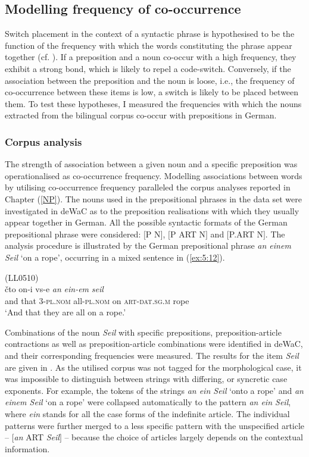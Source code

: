 \subsection{Modelling frequency of co-occurrence}

Switch placement in the context of a syntactic phrase is hypothesised to be the function of the frequency with which the words constituting the phrase appear together (cf. \citealt[33]{bybee-book-2010}). If a preposition and a noun co-occur with a high frequency, they exhibit a strong bond, which is likely to repel a code-switch. Conversely, if the association between the preposition and the noun is loose, i.e., the frequency of co-occurrence between these items is low, a switch is likely to be placed between them. To test these hypotheses, I measured the frequencies with which the nouns extracted from the bilingual corpus co-occur with prepositions in German.

\subsubsection{Corpus analysis}

\noindent The strength of association between a given noun and a specific preposition was operationalised as co-occurrence frequency.  Modelling associations between words by utilising co-occurrence frequency paralleled the corpus analyses reported in Chapter (\ref{NP}). The nouns used in the prepositional phrases in the data set were investigated in deWaC as to the preposition realisations with which they usually appear together in German. All the possible syntactic formats of the German prepositional phrase were considered: $[$P N$]$, $[$P ART N$]$ and $[$P.ART N$]$. The analysis procedure is illustrated by the German prepositional phrase \textit{an einem Seil} `on a rope', occurring in a mixed sentence in (\ref{ex:5:12}).

\ea
\label{ex:5:12}
(LL0510)\\
 {čto} {on-i} {vs-e} \textit{an} \textit{ein-em} \textit{seil}\\
	{and} that 3-\textsc{pl.nom} all-\textsc{pl.nom} on \textsc{art-dat.sg.m} rope\\
\glt `And that they are all on a rope.'
\z

\noindent Combinations of the noun \textit{Seil} with specific prepositions, preposition-article contractions as well as preposition-article combinations were identified in deWaC, and their corresponding frequencies were measured. The results for the item \textit{Seil} are given in . As the utilised corpus was not tagged for the morphological case, it was impossible to distinguish between strings with differing, or syncretic case exponents. For example, the tokens of the strings \textit{an ein Seil} `onto a rope' and \textit{an einem Seil} `on a rope' were collapsed automatically to the pattern \textit{an ein Seil}, where \textit{ein} stands for all the case forms of the indefinite article. The individual patterns were further merged to a less specific pattern with the unspecified article -- $[$\textit{an} ART \textit{Seil}$]$ -- because the choice of articles largely depends on the contextual information.

